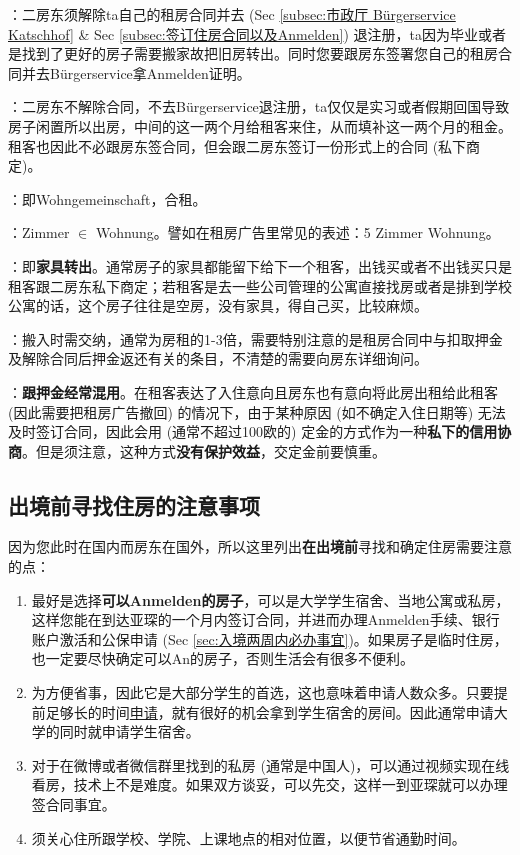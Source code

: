     ：二房东须解除ta自己的租房合同并去 (Sec \ref{subsec:市政厅 Bürgerservice Katschhof} \& Sec \ref{subsec:签订住房合同以及Anmelden}) 退注册，ta因为毕业或者是找到了更好的房子需要搬家故把旧房转出。同时您要跟房东签署您自己的租房合同并去Bürgerservice拿Anmelden证明。

    ：二房东不解除合同，不去Bürgerservice退注册，ta仅仅是实习或者假期回国导致房子闲置所以出房，中间的这一两个月给租客来住，从而填补这一两个月的租金。租客也因此不必跟房东签合同，但会跟二房东签订一份形式上的合同 (私下商定)。

    ：即Wohngemeinschaft，合租。

    ：Zimmer $\in$ Wohnung。譬如在租房广告里常见的表述：5 Zimmer Wohnung。

    ：即\textbf{家具转出}。通常房子的家具都能留下给下一个租客，出钱买或者不出钱买只是租客跟二房东私下商定；若租客是去一些公司管理的公寓直接找房或者是排到学校公寓的话，这个房子往往是空房，没有家具，得自己买，比较麻烦。

    ：搬入时需交纳，通常为房租的1-3倍，需要特别注意的是租房合同中与扣取押金及解除合同后押金返还有关的条目，不清楚的需要向房东详细询问。

    ：\textbf{跟押金经常混用}。在租客表达了入住意向且房东也有意向将此房出租给此租客 (因此需要把租房广告撤回) 的情况下，由于某种原因 (如不确定入住日期等) 无法及时签订合同，因此会用 (通常不超过100欧的) 定金的方式作为一种\textbf{私下的信用协商}。但是须注意，这种方式\textbf{没有保护效益}，交定金前要慎重。

  \subsection{出境前寻找住房的注意事项}\label{subsec:出境前寻找住房的注意事项}

    因为您此时在国内而房东在国外，所以这里列出\textbf{在出境前}寻找和确定住房需要注意的点：

    \begin{enumerate}
      \item 最好是选择\textbf{可以Anmelden的房子}，可以是大学学生宿舍、当地公寓或私房，这样您能在到达亚琛的一个月内签订合同，并进而办理Anmelden手续、银行账户激活和公保申请 (Sec \ref{sec:入境两周内必办事宜})。如果房子是临时住房，也一定要尽快确定可以An的房子，否则生活会有很多不便利。
      \item {}为方便省事，因此它是大部分学生的首选，这也意味着申请人数众多。只要提前足够长的时间\href{https://bewerberportal.stw.rwth-aachen.de/}{申请}，就有很好的机会拿到学生宿舍的房间。因此通常申请大学的同时就申请学生宿舍。
      \item 对于在微博或者微信群里找到的私房 (通常是中国人)，可以通过视频实现在线看房，技术上不是难度。如果双方谈妥，可以先交，这样一到亚琛就可以办理签合同事宜。
      \item 须关心住所跟学校、学院、上课地点的相对位置，以便节省通勤时间。
    \end{enumerate}

